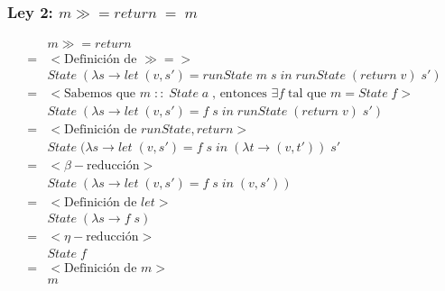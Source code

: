 \documentclass[a4paper]{report}
\newcommand{\bind}{\gg\!\!=}
\begin{document}
\subsubsection*{Ley 2: $m \bind return \; = \; m$}
\begin{align*}
    & m \bind return \\
    = & < \text{Definici\'on de } \bind > \\
    & State \; (\lambda s \to let \; (v,s') = runState\; m\; s\;
        in\; runState\; (return\; v)\; s') \\
    = & < \text{Sabemos que } m\; ::\; State\; a\; \text{, entonces }
         \exists f\; \text{tal que } m = State\; f > \\
    & State \; (\lambda s \to let \; (v,s') = f\; s\;
        in\; runState\; (return\; v)\; s') \\
    = & < \text{Definici\'on de } runState, return > \\
    & State \; (\lambda s \to let\; (v,s') = f\; s\;
        in\; (\lambda t \to (v,t'))\; s' \\
    = & < \beta -\text{reducci\'on} > \\
    & State\; (\lambda s \to let\; (v,s') = f\; s\; in\; (v,s')) \\
    = & < \text{Definici\'on de } let > \\
    & State\; (\lambda s \to f\; s) \\
    = & < \eta -\text{reducci\'on} > \\ 
    & State\; f \\
    = & < \text{Definici\'on de } m > \\
    & m
\end{align*}
\end{document}
